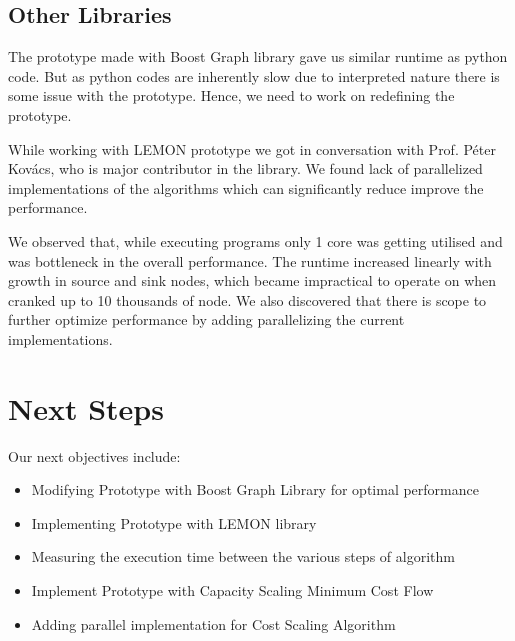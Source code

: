 \documentclass{article}
\begin{document}
\subsection{Other Libraries}
The prototype made with Boost Graph library gave us similar runtime as python code. But as python codes are inherently slow due to interpreted nature there is some issue with the prototype. Hence, we need to work on redefining the prototype. 

While working with LEMON prototype we got in conversation with Prof. Péter Kovács, who is major contributor in the library\cite{DEZSO201123}. We found lack of parallelized implementations of the algorithms which can significantly reduce improve the performance. 

We observed that, while executing programs only 1 core was getting utilised and was bottleneck in the overall performance. The runtime increased linearly with growth in source and sink nodes, which became impractical to operate on when cranked up to 10 thousands of node. We also discovered that there is scope to further optimize performance by adding parallelizing the current implementations. 

\section{Next Steps}
Our next objectives include:
\begin{itemize}
    \item Modifying Prototype with Boost Graph Library for optimal performance
    \item Implementing Prototype with LEMON library
    \item Measuring the execution time between the various steps of algorithm
    \item Implement Prototype with Capacity Scaling Minimum Cost Flow
    \item Adding parallel implementation for Cost Scaling Algorithm
\end{itemize}





\end{document}
